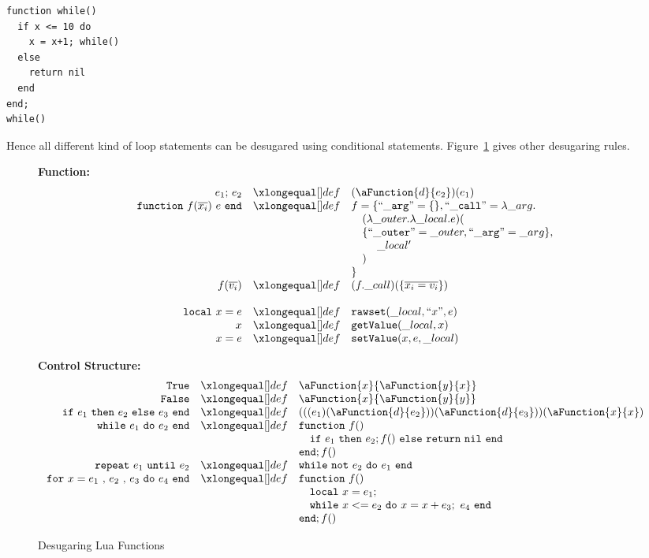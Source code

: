 \begin{verbatim}
function while()
  if x <= 10 do
    x = x+1; while()
  else
    return nil
  end
end;
while()
\end{verbatim}

Hence all different kind of loop statements can be desugared using conditional statements. Figure~\ref{fig:desLuaFunc} gives other desugaring rules.

\begin{figure}
\caption{Desugaring Lua Functions}\label{fig:desLuaFunc}
{\bf Function:}\[
\begin{array}{rclcl}
\desugar{e_1{\tt ;}~e_2}{(\aFunction{d}{e_2})(e_1)}
\desugar{{\tt function}~f(\overline{x_i})~e~{\tt end}}{f = \{ {\tt ``\_arg"} = \{\}, {\tt ``\_call"} = \lambda\_arg.}
\desugarline{
  \quad(\lambda\_outer.\lambda\_local.e)(\\
  \quad\{{\tt ``\_outer"} = \_outer, {\tt ``\_arg" }= \_arg\},\\
  \quad\quad~\_local'\\
  \quad)\\
\}
}
\desugar{f(\overline{v_i})}{(f.\_call)(\{\overline{x_i = v_i}\})}
\\
\desugar{{\tt local}~x=e}{{\tt rawset}(\_local, ``x", e)}
\desugar{x}{{\tt getValue}(\_local, x)}
\desugar{x=e}{{\tt setValue}(x, e, \_local)}

\end{array}\]


{\bf Control Structure:}\[
\begin{array}{rclcl}

\desugar{\tt True}{\aFunction{x}{\aFunction{y}{x}}}
\desugar{\tt False}{\aFunction{x}{\aFunction{y}{y}}}
\desugar{
    {\tt if}~e_1~{\tt then}~e_2~{\tt else}~e_3~{\tt end}
}{
    (((e_1)(\aFunction{d}{e_2}))(\aFunction{d}{e_3}))(\aFunction{x}{x})
}
\desugar{{\tt while}~e_1~{\tt do}~e_2~{\tt end}}{
    {\tt function}~f()
}
\desugarline{ \quad{\tt if}~e_1~{\tt then}~e_2;f()~{\tt else}~{\tt return}~{\tt nil}~{\tt end}\\
{\tt end};f()
}
\desugar{{\tt repeat}~e_1~{\tt until}~e_2}{
   {\tt while}~{\tt not}~e_2~{\tt do}~e_1~{\tt end}\\
}
\desugar{{\tt for}~x=e_1~{\tt ,}~e_2~{\tt ,}~e_3~{\tt do}~e_4~{\tt end}}{
    {\tt function}~f()
}
\desugarline{
    \quad {\tt local}~x = e_1;\\
    \quad {\tt while}~x<= e_2~{\tt do}~x = x + e_3;~e_4~{\tt end}\\
    {\tt end};f()\\
}
\end{array}\]
\end{figure}
